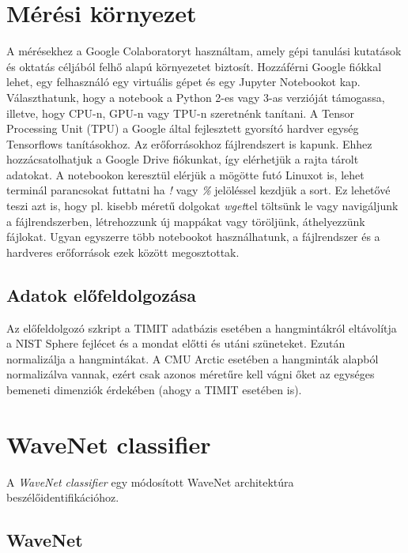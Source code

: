 \section{Mérési környezet}

A mérésekhez a Google Colaboratoryt használtam, amely gépi tanulási kutatások és oktatás céljából felhő alapú környezetet biztosít. Hozzáférni Google fiókkal lehet, egy felhasználó egy virtuális gépet és egy Jupyter Notebookot kap. Választhatunk, hogy  a notebook a Python 2-es vagy 3-as verzióját támogassa, illetve, hogy CPU-n, GPU-n vagy TPU-n szeretnénk tanítani. A Tensor Processing Unit (TPU) a Google által fejlesztett gyorsító hardver egység Tensorflows tanításokhoz.
\newline
\newline
Az erőforrásokhoz fájlrendszert is kapunk. Ehhez hozzácsatolhatjuk a Google Drive fiókunkat, így elérhetjük a rajta tárolt adatokat. A notebookon keresztül elérjük a mögötte futó Linuxot is, lehet terminál parancsokat futtatni ha \emph{!} vagy \emph{\%} jelöléssel kezdjük a sort. Ez lehetővé teszi azt is, hogy pl. kisebb méretű dolgokat \emph{wget}tel töltsünk le vagy navigáljunk a fájlrendszerben, létrehozzunk új mappákat vagy töröljünk, áthelyezzünk fájlokat. Ugyan egyszerre több notebookot használhatunk, a fájlrendszer és a hardveres erőforrások ezek között megosztottak.

\subsection{Adatok előfeldolgozása}

Az előfeldolgozó szkript a TIMIT adatbázis esetében a hangmintákról eltávolítja a NIST Sphere fejlécet és a mondat előtti és utáni szüneteket. Ezután normalizálja a hangmintákat. A CMU Arctic esetében a hangminták alapból normalizálva vannak, ezért csak azonos méretűre kell vágni őket az egységes bemeneti dimenziók érdekében (ahogy a TIMIT esetében is).

\section{WaveNet classifier}

A \emph{WaveNet classifier} egy módosított WaveNet architektúra beszélőidentifikációhoz.

\subsection{WaveNet}

